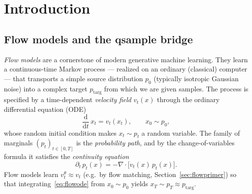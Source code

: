 \documentclass[11pt, a4paper]{article}
\newcommand{\Rset}{\mathbb{R}}
\begin{document}
\begin{abstract}
between the source and the data channels in place of the stationary diagonal
surrogate, while preserving the Hermiticity required by the SIRK pipeline.
Second, the full \emph{Tomographic Subspace Recovery} (TSR) pipeline: a
two-level Count-Sketch hashing scheme ($S_1:\Rset^d\to\Rset^k$, $S_2$:
features $\to$ $K_2$-dim single-excitation Fock states) that decouples
semantics from reasoning, pre-projects all raw-coordinate observables into
the $m^2$ Krylov operator basis, and executes online generation in four
phases (encode, evolve, tomographic reconstruct, lossless decode) with
\emph{no} $\mathcal{O}(M)$ dependence at inference. We close by detailing
the integration into \texttt{unfer}'s GPU-accelerated \texttt{fock\textunderscore
sirk} solver, its \texttt{nested\textunderscore fock\textunderscore algebra}
CAS, the new \texttt{qfm} tomographic crate, and the Austral module runtime.
\end{abstract}

\tableofcontents

\section{Introduction}

\subsection{Flow models and the qsample bridge}

\emph{Flow models} are a cornerstone of modern generative machine learning.
They learn a continuous-time Markov process --- realized on an ordinary
(classical) computer --- that transports a simple source distribution $p_0$
(typically isotropic Gaussian noise) into a complex target $p_{\mathrm{targ}}$
from which we are given samples. The process is specified by a time-dependent
\emph{velocity field} $v_t(x)$ through the ordinary differential equation (ODE)
\begin{equation}
  \frac{\mathrm{d}}{\mathrm{d}t}\,x_t=v_t(x_t),\qquad x_0\sim p_0,
  \label{eq:flowode}
\end{equation}
whose random initial condition makes $x_t\sim p_t$ a random variable. The
family of marginals $(p_t)_{t\in[0,T]}$ is the \emph{probability path}, and by
the change-of-variables formula it satisfies the \emph{continuity equation}
\begin{equation}
  \partial_t\,p_t(x)=-\nabla\!\cdot\bigl[v_t(x)\,p_t(x)\bigr].
  \label{eq:continuityeq}
\end{equation}
Flow models learn $v_t^\theta\approx v_t$ (e.g.\ by flow matching,
Section~\ref{sec:flowprimer}) so that integrating~\eqref{eq:flowode} from
$x_0\sim p_0$ yields $x_T\sim p_T\approx p_{\mathrm{targ}}$.
\end{document}
